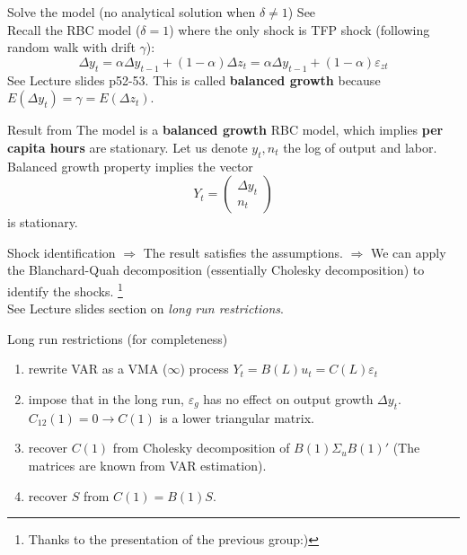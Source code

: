 \documentclass[10pt]{beamer}
\begin{document}
\begin{frame}{Solve the model (no analytical solution when $\delta \neq 1$)}
	See \cite{christiano_eichenbaum_2020}\\
	Recall the RBC model ($\delta=1$) where the only shock is TFP shock (following random walk with drift $\gamma$):
	\begin{equation*}
		\Delta y_t = \alpha \Delta y_{t-1} + (1-\alpha) \Delta z_t = \alpha \Delta y_{t-1} + (1-\alpha) \varepsilon_{z t}
	\end{equation*}
	See Lecture slides p52-53. This is called \textbf{balanced growth} because $E(\Delta y_t) = \gamma = E(\Delta z_t)$.
	\begin{alertblock}{Result from \cite{christiano_eichenbaum_2020}}
		The model is a \textbf{balanced growth} RBC model, which implies \textbf{per capita hours} are stationary. Let us denote $y_t, n_t$ the log of output and labor. Balanced growth property implies the vector
		\begin{equation*}
			Y_t = \begin{pmatrix}
			\Delta y_t \\ n_t
			\end{pmatrix}
		\end{equation*} is stationary.
	\end{alertblock}
\end{frame}
\begin{frame}{Shock identification}
	$\Longrightarrow$ The result satisfies the \cite{blanchard_quah_1988} assumptions.
	$\Longrightarrow$ We can apply the Blanchard-Quah decomposition (essentially Cholesky decomposition) to identify the shocks. \footnote{Thanks to the presentation of the previous group:)}\\
	See Lecture slides section on \emph{long run restrictions}.
\end{frame}
\begin{frame}{Long run restrictions (for completeness)}
	\begin{enumerate}
		\item rewrite VAR as a VMA ($\infty$) process $Y_t=B(L)u_t=C(L)\varepsilon_t$
		\item impose that in the long run, $\varepsilon_g$ has no effect on output growth
		      $\Delta y_t$. $C_{12}(1)=0\rightarrow C(1)$ is a lower triangular matrix.
		\item recover $C(1)$ from Cholesky decomposition of $B(1)\Sigma_u B(1)'$ (The
		      matrices are known from VAR estimation).
		\item recover $S$ from $C(1)=B(1)S$.
	\end{enumerate}
\end{frame}
\end{document}
